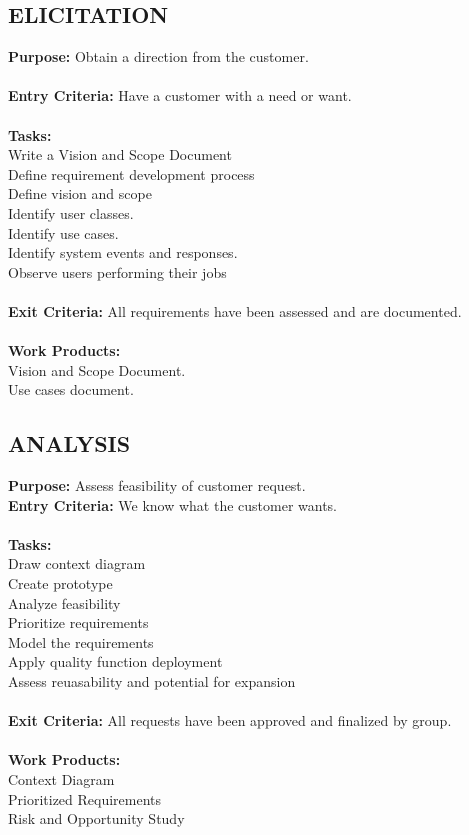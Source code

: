 \documentclass[11pt]{article}
\begin{document}
\subsection{ELICITATION}
\textbf{Purpose:} Obtain a direction from the customer.\\
\\
\textbf{Entry Criteria: }Have a customer with a need or want.\\
\\
\textbf{Tasks:} \\
Write a Vision and Scope Document \\
Define requirement development process\\
Define vision and scope\\
Identify user classes. \\
Identify use cases. \\
Identify system events and responses. \\
Observe users performing their jobs\\
\\
\textbf{Exit Criteria:} All requirements have been assessed and are documented.\\
\\
\textbf{Work Products:} \\
Vision and Scope Document.\\
Use cases document.\\

\subsection{ANALYSIS}
\textbf{Purpose:} Assess feasibility of customer request. \\
\textbf{Entry Criteria:} We know what the customer wants. \\
\\
\textbf{Tasks:} \\
Draw context diagram \\
Create prototype \\
Analyze feasibility \\
Prioritize requirements \\
Model the requirements \\
Apply quality function deployment \\
Assess reuasability and potential for expansion \\
\\
\textbf{Exit Criteria:} All requests have been approved and finalized by group. \\
\\
\textbf{Work Products:} \\
Context Diagram \\
Prioritized Requirements \\
Risk and Opportunity Study \\
\end{document}
